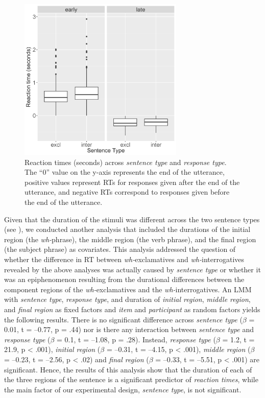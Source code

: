 \documentclass[output=paper]{langsci/langscibook}
\begin{document}
\begin{figure}
\includegraphics[width=0.7\textwidth]{figures/KEL-img3_big.png}
\caption{Reaction times (seconds) across \textit{sentence type} and \textit{response type}. The “0” value on the y-axis represents the end of the utterance, positive values represent RTs for responses given after the end of the utterance, and negative RTs correspond to responses given before the end of the utterance.}
\label{fig:kel:3}
\end{figure}


Given that the duration of the stimuli was different across the two sentence types (see ), we conducted another analysis that included the durations of the initial region (the \textit{wh-}phrase), the middle region (the verb phrase), and the final region (the subject phrase) as covariates. This analysis addressed the question of whether the difference in RT between \textit{wh-}exclamatives and \textit{wh-}interrogatives revealed by the above analyses was actually caused by \textit{sentence type} or whether it was an epiphenomenon resulting from the durational differences between the component regions of the \textit{wh-}exclamatives and the \textit{wh-}interrogatives. An LMM with \textit{sentence type}, \textit{response type}, and duration of \textit{initial region}, \textit{middle region}, and \textit{final region} as fixed factors and \textit{item} and \textit{participant} as random factors yields the following results. There is no significant difference across \textit{sentence type} ($\beta $  = 0.01, t = –0.77, p = .44) nor is there any interaction between \textit{sentence type} and \textit{response type} ($\beta $  = 0.1, t = –1.08, p = .28). Instead, \textit{response type} ($\beta $  = 1.2, t = 21.9, p < .001), \textit{initial region} ($\beta $  = –0.31, t = –4.15, p < .001), \textit{middle region} ($\beta $  = –0.23, t = –2.56, p < .02) and \textit{final region} ($\beta $  = –0.33, t = –5.51, p < .001) are significant. Hence, the results of this analysis show that the duration of each of the three regions of the sentence is a significant predictor of \textit{reaction times}, while the main factor of our experimental design, \textit{sentence type}, is not significant.
\end{document}
